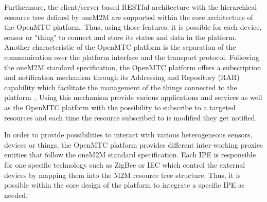 Furthermore, the client/server based RESTful architecture with the hierarchical resource tree defined by oneM2M are supported within the core architecture of the OpenMTC platform. Thus, using those features, it is possible for each device, sensor or "thing" to connect and store its states and data in the platform. Another characteristic of the OpenMTC platform is the separation of the communication over the platform interface and the transport protocol. Following the oneM2M standard specification, the OpenMTC platform offers a subscription and notification mechanism through its Addressing and Repository (RAR) capability which facilitate the management of the things connected to the platform~\cite{openmtc}. Using this mechanism provide various applications and services as well as the OpenMTC platform with the possibility to subscribe to a targeted resources and each time the resource subscribed to is modified they get notified.\par 
 In order to provide possibilities to interact with various heterogeneous sensors, devices or things, the OpenMTC platform provides different inter-working proxies entities that follow the oneM2M standard specification. Each IPE is responsible for one specific technology such as ZigBee or IEC which control the external devices by mapping them into the M2M resource tree structure. Thus, it is possible within the core design of the platform to integrate a specific IPE as needed.

